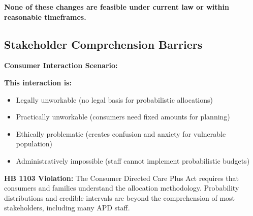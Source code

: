 \textbf{None of these changes are feasible under current law or within reasonable timeframes.}

\subsection{Stakeholder Comprehension Barriers}

\textbf{Consumer Interaction Scenario:}

\begin{center}
\end{center}

\textbf{This interaction is:}
\begin{itemize}
    \item Legally unworkable (no legal basis for probabilistic allocations)
    \item Practically unworkable (consumers need fixed amounts for planning)
    \item Ethically problematic (creates confusion and anxiety for vulnerable population)
    \item Administratively impossible (staff cannot implement probabilistic budgets)
\end{itemize}

\textbf{HB 1103 Violation:} The Consumer Directed Care Plus Act requires that consumers and families understand the allocation methodology. Probability distributions and credible intervals are beyond the comprehension of most stakeholders, including many APD staff.

